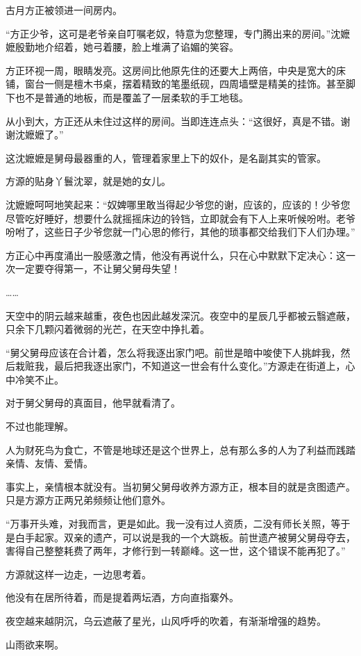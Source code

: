 \begin{this_body}
古月方正被领进一间房内。

“方正少爷，这可是老爷亲自叮嘱老奴，特意为您整理，专门腾出来的房间。”沈嬷嬷殷勤地介绍着，她弓着腰，脸上堆满了谄媚的笑容。

方正环视一周，眼睛发亮。这房间比他原先住的还要大上两倍，中央是宽大的床铺，窗台一侧是檀木书桌，摆着精致的笔墨纸砚，四周墙壁是精美的挂饰。甚至脚下也不是普通的地板，而是覆盖了一层柔软的手工地毯。

从小到大，方正还从未住过这样的房间。当即连连点头：“这很好，真是不错。谢谢沈嬷嬷了。”

这沈嬷嬷是舅母最器重的人，管理着家里上下的奴仆，是名副其实的管家。

方源的贴身丫鬟沈翠，就是她的女儿。

沈嬷嬷呵呵地笑起来：“奴婢哪里敢当得起少爷您的谢，应该的，应该的！少爷您尽管吃好睡好，想要什么就摇摇床边的铃铛，立即就会有下人上来听候吩咐。老爷吩咐了，这些日子少爷您就一门心思的修行，其他的琐事都交给我们下人们办理。”

方正心中再度涌出一股感激之情，他没有再说什么，只在心中默默下定决心：这一次一定要夺得第一，不让舅父舅母失望！

……

天空中的阴云越来越重，夜色也因此越发深沉。夜空中的星辰几乎都被云翳遮蔽，只余下几颗闪着微弱的光芒，在天空中挣扎着。

“舅父舅母应该在合计着，怎么将我逐出家门吧。前世是暗中唆使下人挑衅我，然后栽赃我，最后把我逐出家门，不知道这一世会有什么变化。”方源走在街道上，心中冷笑不止。

对于舅父舅母的真面目，他早就看清了。

不过也能理解。

人为财死鸟为食亡，不管是地球还是这个世界上，总有那么多的人为了利益而践踏亲情、友情、爱情。

事实上，亲情根本就没有。当初舅父舅母收养方源方正，根本目的就是贪图遗产。只是方源方正两兄弟频频让他们意外。

“万事开头难，对我而言，更是如此。我一没有过人资质，二没有师长关照，等于是白手起家。双亲的遗产，可以说是我的一个大跳板。前世遗产被舅父舅母夺去，害得自己整整耗费了两年，才修行到一转巅峰。这一世，这个错误不能再犯了。”

方源就这样一边走，一边思考着。

他没有在居所待着，而是提着两坛酒，方向直指寨外。

夜空越来越阴沉，乌云遮蔽了星光，山风呼呼的吹着，有渐渐增强的趋势。

山雨欲来啊。


\end{this_body}
